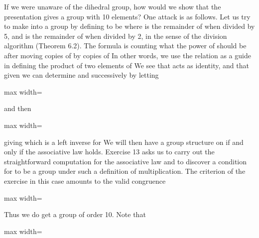\documentclass[11pt,oneside]{article}
\begin{document}
\begin{BookBody}
If we were unaware of the dihedral group, how would we show that the presentation gives a group with 10 elements? One attack is as follows. Let us try to make  into a group by defining  to be  where  is the remainder of  when divided by 5, and  is the remainder of  when divided by 2, in the sense of the division algorithm (Theorem 6.2). The formula  is counting what the power of  should be after moving  copies of  by  copies of  In other words, we use the relation  as a guide in defining the product  of two elements of  We see that  acts as identity, and that given  we can determine  and  successively by letting

\begin{center}\begin{adjustbox}{max width=\linewidth}\end{adjustbox}\end{center}

\noindent and then

\begin{center}\begin{adjustbox}{max width=\linewidth}\end{adjustbox}\end{center}

\noindent giving  which is a left inverse for  We will then have a group structure on  if and only if the associative law holds. Exercise 13 asks us to carry out the straightforward computation for the associative law and to discover a condition for  to be a group under such a definition of multiplication. The criterion of the exercise in this case amounts to the valid congruence

\begin{center}\begin{adjustbox}{max width=\linewidth}\end{adjustbox}\end{center}

\noindent Thus we do get a group of order 10. Note that

\begin{center}\begin{adjustbox}{max width=\linewidth}\end{adjustbox}\end{center}

\end{BookBody}
\end{document}
